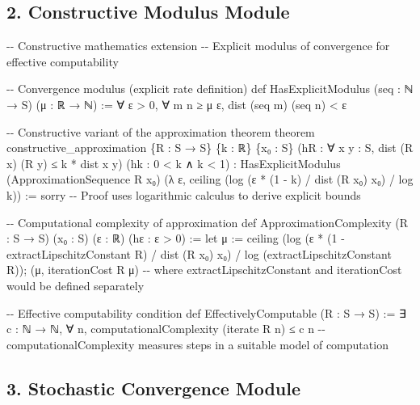 \documentclass[
]{article}
\newenvironment{Shaded}{}{}
\newcommand{\NormalTok}[1]{#1}
\begin{document}
\subsection{2. Constructive Modulus
Module}\label{constructive-modulus-module}

\begin{Shaded}
\begin{Highlighting}[]
\NormalTok{{-}{-} Constructive mathematics extension}
\NormalTok{{-}{-} Explicit modulus of convergence for effective computability}

\NormalTok{{-}{-} Convergence modulus (explicit rate definition)}
\NormalTok{def HasExplicitModulus (seq : ℕ → S) (μ : ℝ → ℕ) :=}
\NormalTok{  ∀ ε \textgreater{} 0, ∀ m n ≥ μ ε, dist (seq m) (seq n) \textless{} ε}

\NormalTok{{-}{-} Constructive variant of the approximation theorem}
\NormalTok{theorem constructive\_approximation}
\NormalTok{  \{R : S → S\} \{k : ℝ\} \{x₀ : S\}}
\NormalTok{  (hR : ∀ x y : S, dist (R x) (R y) ≤ k * dist x y)}
\NormalTok{  (hk : 0 \textless{} k ∧ k \textless{} 1) :}
\NormalTok{  HasExplicitModulus (ApproximationSequence R x₀) (λ ε, ceiling (log (ε * (1 {-} k) / dist (R x₀) x₀) / log k)) :=}
\NormalTok{  sorry {-}{-} Proof uses logarithmic calculus to derive explicit bounds}

\NormalTok{{-}{-} Computational complexity of approximation}
\NormalTok{def ApproximationComplexity (R : S → S) (x₀ : S) (ε : ℝ) (hε : ε \textgreater{} 0) :=}
\NormalTok{  let μ := ceiling (log (ε * (1 {-} extractLipschitzConstant R) / dist (R x₀) x₀) / log (extractLipschitzConstant R));}
\NormalTok{  (μ, iterationCost R μ)}
\NormalTok{  {-}{-} where extractLipschitzConstant and iterationCost would be defined separately}

\NormalTok{{-}{-} Effective computability condition}
\NormalTok{def EffectivelyComputable (R : S → S) :=}
\NormalTok{  ∃ c : ℕ → ℕ, ∀ n, computationalComplexity (iterate R n) ≤ c n}
\NormalTok{  {-}{-} computationalComplexity measures steps in a suitable model of computation}
\end{Highlighting}
\end{Shaded}

\subsection{3. Stochastic Convergence
Module}\label{stochastic-convergence-module}
\end{document}
